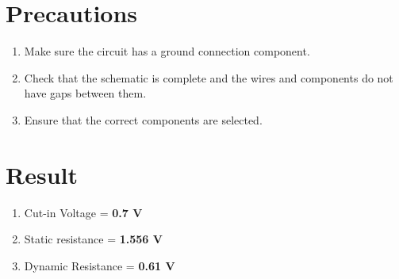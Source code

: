 \documentclass{article}
\begin{document}
	\section{Precautions}
	\begin{enumerate}
		\item Make sure the circuit has a ground connection component.
		\item Check that the schematic is complete and the wires and components do not have gaps between them.
		\item Ensure that the correct components are selected.
	\end{enumerate}

	\section{Result}
	\begin{enumerate}
		\item Cut-in Voltage =\textbf{ 0.7 V}
		\item Static resistance =\textbf{ 1.556 V}
		\item Dynamic Resistance =\textbf{ 0.61 V}
	\end{enumerate}
\end{document}
